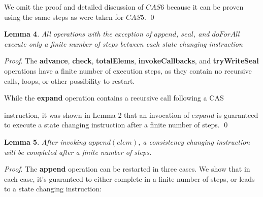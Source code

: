 \documentclass[runningheads,a4paper]{llncs}
\begin{document}
We omit the proof and detailed discussion of $CAS6$ because it can be proven 
using the same steps as were taken for $CAS5$. 
\qed


\textbf{Lemma 4}. \textit{All operations with the exception of $append$,
$seal$, and $doForAll$ execute only a finite number of steps between each
state changing instruction}

\textit{Proof}. The \textbf{advance}, \textbf{check}, \textbf{totalElems},
\textbf{invokeCallbacks}, and \textbf{tryWriteSeal}  operations have a finite
number of execution steps, as they contain no recursive calls, loops, or other
possibility to restart.

While the \textbf{expand} operation contains a recursive call following a CAS

instruction, it was shown in Lemma 2 that an invocation of $expand$ is
guaranteed to execute a state changing instruction after a finite number of
steps. 
\qed


\textbf{Lemma 5}. \textit{After invoking $append(elem)$, a consistency
changing instruction will be completed after a finite number of steps.}

\textit{Proof}.
The \textbf{append} operation can be restarted in three cases. We show that in
each case, it's guaranteed to either complete in a finite number of steps,  or
leads to a state changing instruction:
\end{document}
